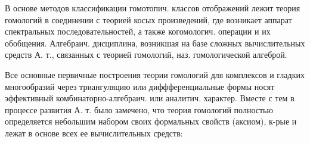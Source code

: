 \documentclass[10pt]{article}
\begin{document}
В основе методов классификации гомотопич. классов отображений лежит теория гомологий в соединении с теорией косых произведений, где возникает аппарат спектральных последовательностей, а также когомологич. операции и их обобщения. Алгебраич. дисциплина, возникшая на базе сложных вычислительных средств А. т., связанных с теорией гомологий, наз. гомологической алгеброй.



Все основные первичные построения теории гомологий для комплексов и гладких многообразий через триангуляцию или диффференциальные формы носят эффективный комбинаторно-алгебраич. или аналитич. характер. Вместе с тем в процессе развития А. т. было замечено, что теория гомологий полностью определяется небольшим набором своих формальных свойств (аксиом), к-рые и лежат в основе всех ее вычислительных средств:
\end{document}
